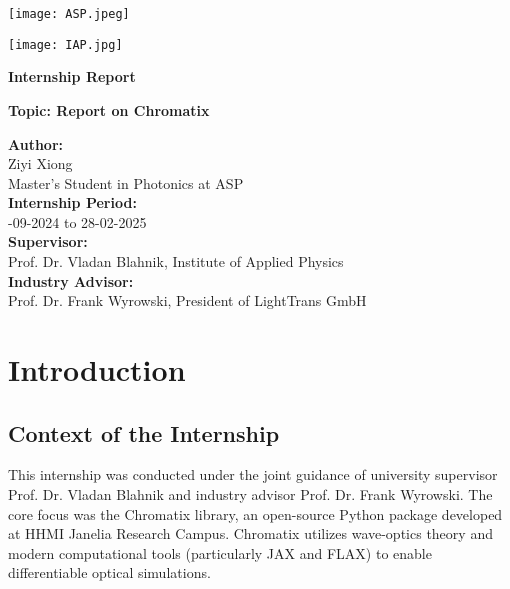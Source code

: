 \documentclass[a4paper,12pt]{report}
\begin{document}
\begin{titlepage}
    \begin{minipage}[t]{0.5\textwidth}
        \texttt{[image: ASP.jpeg]}
    \end{minipage}
    \hfill
    \begin{minipage}[t]{0.5\textwidth}
        \raggedleft
        \texttt{[image: IAP.jpg]}
    \end{minipage}

    \vspace{1cm}

    {\Huge\centering\bfseries Internship Report\\[0.5cm]}
    \vspace{1cm}

    \raggedright
    \large

    {\centering\bfseries Topic: Report on Chromatix\\}

    \vspace{2cm}

    \centering\textbf{Author:}\\[0.5cm]
    \centering Ziyi Xiong\\[0.5cm]
    \centering Master's Student in Photonics at ASP\\[0.5cm]

    \centering\textbf{Internship Period:}\\[0.5cm] 
    -09-2024 to 28-02-2025\\[0.5cm]

    \centering \textbf{Supervisor:} \\[0.5cm]
    \centering Prof. Dr. Vladan Blahnik, Institute of Applied Physics\\[0.5cm]

    \centering\textbf{Industry Advisor:} \\[0.5cm]
    \centering Prof. Dr. Frank Wyrowski, President of LightTrans GmbH\\

    \vfill
\end{titlepage}

\tableofcontents
\newpage

\chapter{Introduction}
\section{Context of the Internship}
This internship was conducted under the joint guidance of university supervisor Prof. Dr. Vladan Blahnik and industry advisor Prof. Dr. Frank Wyrowski. The core focus was the Chromatix library, an open-source Python package developed at HHMI Janelia Research Campus. Chromatix utilizes wave-optics theory and modern computational tools (particularly JAX and FLAX) to enable differentiable optical simulations.
\end{document}
